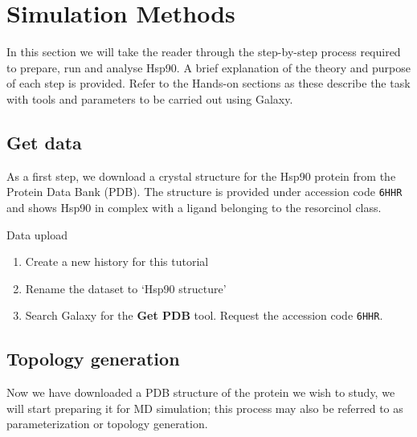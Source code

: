 \documentclass[twocolumn]{bmcart}%
\providecommand{\tightlist}{%
  \setlength{\itemsep}{0pt}\setlength{\parskip}{0pt}}
\begin{document}
\hypertarget{methods}{%
\section*{Simulation Methods}\label{methods}}
In this section we will take the reader through the step-by-step process required to prepare, run and analyse Hsp90. A brief explanation of the theory and purpose of each step is provided. Refer to the Hands-on sections as these describe the task with tools and parameters to be carried out using Galaxy. 


\subsection*{Get data}\label{get-data}

As a first step, we download a crystal structure for the Hsp90 protein from the Protein Data Bank (PDB). The structure is provided under accession code \texttt{6HHR}~\cite{Schuetz2018} and shows Hsp90 in complex with a ligand belonging to the resorcinol class.

\begin{handson_box_colour}{Data upload}

\begin{enumerate}
\def\labelenumi{\arabic{enumi}.}
\tightlist
\item
  Create a new history for this tutorial

\item
  Rename the dataset to `Hsp90 structure'
\item
  Search Galaxy for the \textbf{Get PDB} tool. Request the accession code \texttt{6HHR}.
\end{enumerate}
\end{handson_box_colour}

\subsection*{Topology generation}\label{topology-generation}

Now we have downloaded a PDB structure of the protein we wish to study, we will start preparing it for MD simulation; this process may also be referred to as parameterization or topology generation.
\end{document}
